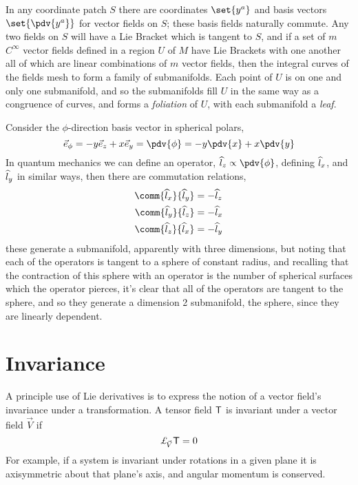 In any coordinate patch $S$ there are coordinates $\set{y^a}$ and
basis vectors $\set{\pdv{y^a}}$ for vector fields on $S$; these basis
fields naturally commute. Any two fields on $S$ will have a Lie
Bracket which is tangent to $S$, and if a set of $m$ $C^{\infty}$
vector fields defined in a region $U$ of $M$ have Lie Brackets with
one another all of which are linear combinations of $m$ vector fields,
then the integral curves of the fields mesh to form a family of
submanifolds. Each point of $U$ is on one and only one submanifold,
and so the submanifolds fill $U$ in the same way as a congruence of
curves, and forms a \emph{foliation} of $U$, with each submanifold a
\emph{leaf}.

\begin{example}
  Consider the $\phi$-direction basis vector in spherical polars,
  \[\vec{e}_{\phi} = - y \vec{e}_z + x \vec{e}_y = \pdv{\phi} = -y
  \pdv{x} + x \pdv{y}\] In quantum mechanics we can define an
  operator, $\Op{l}_z \propto \pdv{\phi}$, defining ${\widehat{l}}_x$, and
  ${\widehat{l}}_y$ in similar ways, then there are commutation relations,
  \begin{align*}
    \comm{\Op{l}_x}{\Op{l}_y} &= - \Op{l}_z \\
    \comm{\Op{l}_y}{\Op{l}_z} &= - \Op{l}_x \\
    \comm{\Op{l}_z}{\Op{l}_x} &= - \Op{l}_y
  \end{align*}
  these generate a submanifold, apparently with three dimensions, but
  noting that each of the operators is tangent to a sphere of constant
  radius, and recalling that the contraction of this sphere with an
  operator is the number of spherical surfaces which the operator
  pierces, it's clear that all of the operators are tangent to the
  sphere, and so they generate a dimension 2 submanifold, the sphere,
  since they are linearly dependent.
\end{example}

\section{Invariance}
\label{sec:invariance}

A principle use of Lie derivatives is to express the notion of a
vector field's invariance under a transformation. A tensor field
$\mathsf{{T}}$ is invariant under a vector field $\vec{V}$ if
\[ \ld{\vec{V}}{\ten{T}} = 0 \] For example, if a system is invariant
under rotations in a given plane it is axisymmetric about that plane's
axis, and angular momentum is conserved.

